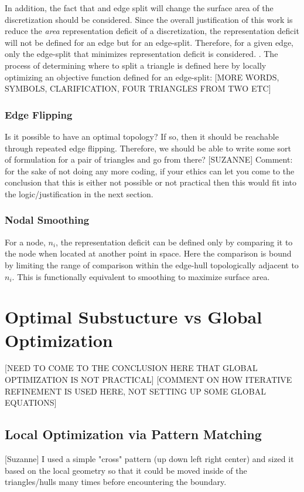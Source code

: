 \documentclass[11pt]{article}
\begin{document}
In addition, the fact that and edge split will change the surface area
of the discretization should be considered. Since the overall
justification of this work is reduce the {\it area} representation
deficit of a discretization, the representation deficit will not be
defined for an edge but for an edge-split. Therefore, for a given edge,
only the edge-split that minimizes representation deficit is considered.
. The process of determining where to split a triangle is defined here
by locally optimizing an objective function defined for an edge-split:
[MORE WORDS, SYMBOLS, CLARIFICATION, FOUR TRIANGLES FROM TWO ETC]

\subsubsection{Edge Flipping}
Is it possible to have an optimal topology? If so, then it should be
reachable through repeated edge flipping. Therefore, we should be able
to write some sort of formulation for a pair of triangles and go from
there? [SUZANNE] Comment: for the sake of not doing any more coding, if
your ethics can let you come to the conclusion that this is either not
possible or not practical then this would fit into the
logic/justification in the next section.
\subsubsection{Nodal Smoothing}
For a node, $n_i$, the representation deficit can be defined only by
comparing it to the node when located at another point in space. Here
the comparison is bound by limiting the range of comparison within the
edge-hull topologically adjacent to $n_i$. This is functionally
equivalent to smoothing to maximize surface area.

\section{Optimal Substucture vs Global Optimization}
[NEED TO COME TO THE CONCLUSION HERE THAT GLOBAL OPTIMIZATION IS NOT
PRACTICAL] [COMMENT ON HOW ITERATIVE REFINEMENT IS USED HERE, NOT
SETTING UP SOME GLOBAL EQUATIONS]
\subsection{Local Optimization via Pattern Matching}
[Suzanne] I used a simple "cross" pattern (up down left right center)
and sized it based on the local geometry so that it could be moved
inside of the triangles/hulls many times before encountering the
boundary.
\end{document}
